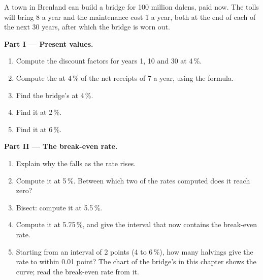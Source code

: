 \begin{problem}
\label{pb:g12:present-value:1}
A town in Brenland can build a bridge for 100 million dalens, paid now. The tolls will bring 8 a year and the maintenance cost 1 a year, both at the end of each of the next
30 years, after which the bridge is worn out.

\medskip
\noindent\textbf{Part I --- Present values.}
\begin{enumerate}
\item Compute the discount factors for years 1, 10 and 30 at 4\,\%.
\item Compute the  at 4\,\% of the net receipts of 7 a year, using the  formula.
\item Find the bridge's  at 4\,\%.
\item Find it at 2\,\%.
\item Find it at 6\,\%.
\end{enumerate}

\medskip
\noindent\textbf{Part II --- The break-even rate.}
\begin{enumerate}[resume]
\item Explain why the  falls as the rate rises.
\item Compute it at 5\,\%. Between which two of the rates computed does it reach zero?
\item Bisect: compute it at 5.5\,\%.
\item Compute it at 5.75\,\%, and give the interval that now contains the break-even rate.
\item Starting from an interval of 2 points (4 to 6\,\%), how many halvings give the rate to within 0.01 point? The chart of the bridge's  in this
  chapter shows the curve; read the break-even rate from it.
\end{enumerate}


\end{problem}
